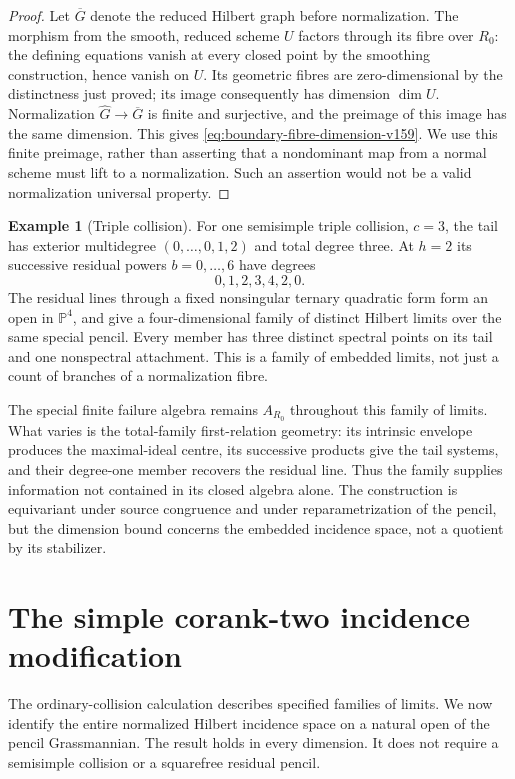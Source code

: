 \documentclass[11pt,reqno]{amsart}
\numberwithin{equation}{section}
\theoremstyle{definition}\newtheorem{definition}[theorem]{Definition}
\newtheorem{example}[theorem]{Example}
\theoremstyle{remark}\newtheorem{remark}[theorem]{Remark}
\newcommand{\Pj}{\mathbb P}\newcommand{\A}{\mathbb A}
\begin{document}
\begin{proof}
Let $\overline G$ denote the reduced Hilbert graph before normalization.
The morphism from the smooth, reduced scheme $U$ factors through its
fibre over $R_0$: the defining equations vanish at every closed point
by the smoothing construction, hence vanish on $U$. Its geometric
fibres are zero-dimensional by the distinctness just proved; its
image consequently has dimension $\dim U$. Normalization
$\widehat G\to\overline G$ is finite and surjective, and the preimage
of this image has the same dimension. This gives
\eqref{eq:boundary-fibre-dimension-v159}.
We use this finite preimage, rather than asserting that a nondominant
map from a normal scheme must lift to a normalization. Such an
assertion would not be a valid normalization universal property.
\end{proof}

\begin{example}[Triple collision]
\label{ex:triple-collision-v159}
For one semisimple triple collision, $c=3$, the tail has exterior
multidegree $(0,\ldots,0,1,2)$ and total degree three. At $h=2$ its
successive residual powers $b=0,\ldots,6$ have degrees
\[
                             0,1,2,3,4,2,0.
\]
The residual lines through a fixed nonsingular ternary quadratic
form form an open in $\Pj^4$, and give a four-dimensional family of
distinct Hilbert limits over the same special pencil. Every member
has three distinct spectral points on its tail and one nonspectral
attachment. This is a family of embedded limits, not just a count
of branches of a normalization fibre.
\end{example}

The special finite failure algebra remains $A_{R_0}$ throughout this
family of limits. What varies is the total-family first-relation
geometry: its intrinsic envelope produces the maximal-ideal centre,
its successive products give the tail systems, and their degree-one
member recovers the residual line. Thus the family supplies information
not contained in its closed algebra alone. The construction is
equivariant under source congruence and under reparametrization of the
pencil, but the dimension bound concerns the embedded incidence space,
not a quotient by its stabilizer.

\section{The simple corank-two incidence modification}
\label{sec:incidence-blowup-v160}
The ordinary-collision calculation describes specified families of
limits. We now identify the entire normalized Hilbert incidence space
on a natural open of the pencil Grassmannian. The result holds in every
dimension. It does not require a semisimple collision or a squarefree
residual pencil.
\end{document}
